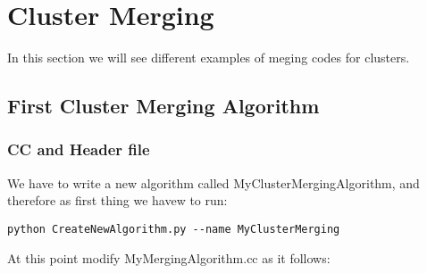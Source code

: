 \chapter{Cluster Merging}

In this section we will see different examples of meging codes for clusters.

\section{First Cluster Merging Algorithm} \label{sssec:first_merging}
\subsection{CC and Header file} \label{sssec:first_merging_ccandh}
We have to write a new algorithm called MyClusterMergingAlgorithm, and therefore as first thing we havew to run:
\begin{verbatim}
python CreateNewAlgorithm.py --name MyClusterMerging
\end{verbatim}
At this point modify MyMergingAlgorithm.cc as it follows:
